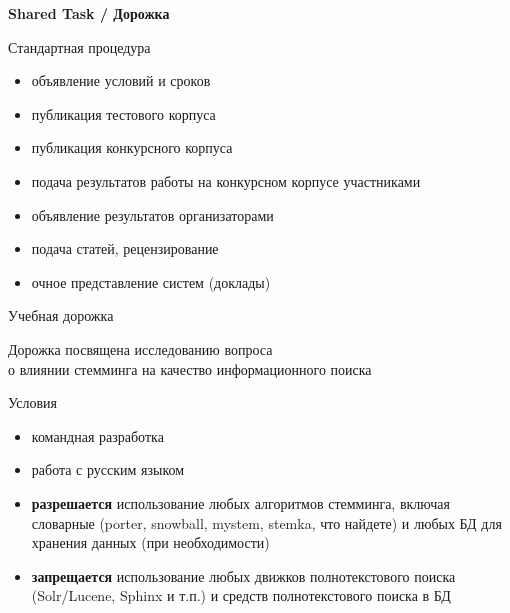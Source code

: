 \documentclass{beamer}
\begin{document}

\begin{frame}{}
\begin{center}
	\textbf{Shared Task / Дорожка}
\end{center}
\end{frame}

\begin{frame}{Стандартная процедура}
\begin{itemize}
    \item объявление условий и сроков
    \item публикация тестового корпуса
    \item публикация конкурсного корпуса
    \item подача результатов работы на конкурсном корпусе участниками
    \item объявление результатов организаторами
    \item подача статей, рецензирование
    \item очное представление систем (доклады)
\end{itemize}
\end{frame}

\begin{frame}{Учебная дорожка}
\begin{center}
Дорожка посвящена исследованию вопроса \\о влиянии стемминга на качество информационного поиска
\end{center}
\end{frame}

\begin{frame}{Условия}
\begin{itemize}
    \item командная разработка
    \item работа с русским языком
    \item \textbf{разрешается} использование любых алгоритмов стемминга, включая словарные (porter, snowball, 
      mystem, stemka, что найдете) и любых БД для хранения данных (при необходимости)
    \item \textbf{запрещается} использование любых движков полнотекстового поиска (Solr/Lucene, Sphinx и т.п.) 
      и средств полнотекстового поиска в БД
\end{itemize}
\end{frame}
\end{document}
